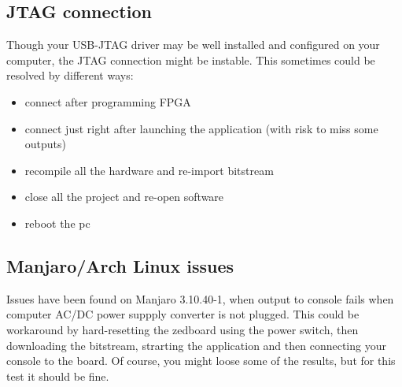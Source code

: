 \documentclass{article}
\begin{document}
\begin{appendices}
	\subsection{JTAG connection}
	Though your USB-JTAG driver may be well installed and configured on your
	computer, the JTAG connection might be instable. This sometimes could be
	resolved by different ways:
	\begin{itemize}
		\item connect after programming FPGA
		\item connect just right after launching the application (with risk to
				miss some outputs)
		\item recompile all the hardware and re-import bitstream
		\item close all the project and re-open software
		\item reboot the pc
	\end{itemize}
	\subsection{Manjaro/Arch Linux issues}
	Issues have been found on Manjaro 3.10.40-1, when output to console fails
	when computer AC/DC power suppply converter is not plugged. This could be
	workaround by hard-resetting the zedboard using the power switch, then
	downloading the bitstream, strarting the application and then connecting
	your console to the board. Of course, you might loose some of the results,
	but for this test it should be fine.

\end{appendices}

	
\end{document}

